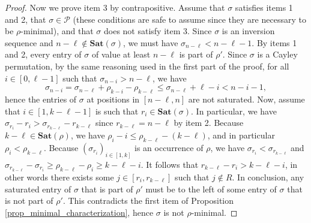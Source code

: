 \documentclass[a4paper,11pt]{article}
\theoremstyle{definition}
\theoremstyle{remark}
\renewcommand{\P}{\mathcal{P}}
\newcommand{\Sat}{\mathbf{Sat}}
\begin{document}
\begin{proof}
    Now we prove item 3 by contrapositive.
    Assume that $\sigma$ satisfies items 1 and 2, that $\sigma \in \P$ (these conditions are safe to assume since they are necessary to be $\rho$-minimal), and that $\sigma$ does not satisfy item 3. Since $\sigma$ is an inversion sequence and $n-\ell \notin \Sat(\sigma)$, we must have $\sigma_{n-\ell} < n - \ell - 1$. By items 1 and 2, every entry of $\sigma$ of value at least $n-\ell$ is part of $\rho'$. Since $\sigma$ is a Cayley permutation, by the same reasoning used in the first part of the proof, for all $i \in [0, \ell-1]$ such that $\sigma_{n-i} > n-\ell$, we have $$\sigma_{n-i} = \sigma_{n-\ell} + \rho_{k-i} - \rho_{k-\ell} \leq \sigma_{n-\ell} +  \ell - i < n-i-1,$$
    hence the entries of $\sigma$ at positions in $[n-\ell, n]$ are not saturated.
    Now, assume that $i \in [1, k-\ell-1]$ is such that $r_i \in \Sat(\sigma)$.
    In particular, we have $\sigma_{r_i} - r_i > \sigma_{r_{k-\ell}} - r_{k-\ell}$ since $r_{k-\ell} = n - \ell$ by item 2. Because $k-\ell \in \Sat(\rho)$, we have $\rho_i - i \leq \rho_{k- \ell} - (k-\ell)$, and in particular $\rho_i < \rho_{k- \ell}$. Because $(\sigma_{r_i})_{i \in [1,k]}$ is an occurrence of $\rho$, we have $\sigma_{r_i} < \sigma_{r_{k-\ell}}$ and $\sigma_{r_{k-\ell}} - \sigma_{r_i} \geq \rho_{k-\ell} - \rho_i \geq k - \ell - i$. It follows that $r_{k-\ell} - r_i > k - \ell - i$, in other words there exists some $j \in [r_i, r_{k-\ell}]$ such that $j \notin R$. In conclusion, any saturated entry of $\sigma$ that is part of $\rho'$ must be to the left of some entry of $\sigma$ that is not part of $\rho'$. This contradicts the first item of Proposition \ref{prop_minimal_characterization}, hence $\sigma$ is not $\rho$-minimal.
\end{proof}
\end{document}
